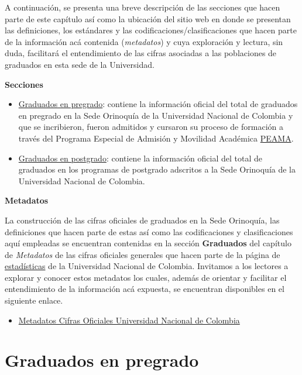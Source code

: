 \documentclass[
]{book}
\providecommand{\tightlist}{%
  \setlength{\itemsep}{0pt}\setlength{\parskip}{0pt}}
\begin{document}
A continuación, se presenta una breve descripción de las secciones que hacen parte de este capítulo así como la ubicación del sitio web en donde se presentan las definiciones, los estándares y las codificaciones/clasificaciones que hacen parte de la información acá contenida (\emph{metadatos}) y cuya exploración y lectura, sin duda, facilitará el entendimiento de las cifras asociadas a las poblaciones de graduados en esta sede de la Universidad.

\textbf{Secciones}

\begin{itemize}
\item
  \protect\hyperlink{GraPre}{Graduados en pregrado}: contiene la información oficial del total de graduados en pregrado en la Sede Orinoquía de la Universidad Nacional de Colombia y que se incribieron, fueron admitidos y cursaron su proceso de formación a través del Programa Especial de Admisión y Movilidad Académica \protect\hyperlink{peama}{PEAMA}.
\item
  \protect\hyperlink{GraPos}{Graduados en postgrado}: contiene la información oficial del total de graduados en los programas de postgrado adscritos a la Sede Orinoquía de la Universidad Nacional de Colombia.
\end{itemize}

\textbf{Metadatos}

La construcción de las cifras oficiales de graduados en la Sede Orinoquía, las definiciones que hacen parte de estas así como las codificaciones y clasificaciones aquí empleadas se encuentran contenidas en la sección \textbf{Graduados} del capítulo de \emph{Metadatos} de las cifras oficiales generales que hacen parte de la página de \href{http://estadisticas.unal.edu.co/home/}{estadísticas} de la Universidad Nacional de Colombia. Invitamos a los lectores a explorar y conocer estos metadatos los cuales, además de orientar y facilitar el entendimiento de la información acá expuesta, se encuentran disponibles en el siguiente enlace.

\begin{itemize}
\tightlist
\item
  \href{http://estadisticas.unal.edu.co/menu-principal/cifras-generales/metadatos/cifras-generales/}{Metadatos Cifras Oficiales Universidad Nacional de Colombia}
\end{itemize}

\hypertarget{GraPre}{%
\section{Graduados en pregrado}\label{GraPre}}
\end{document}
